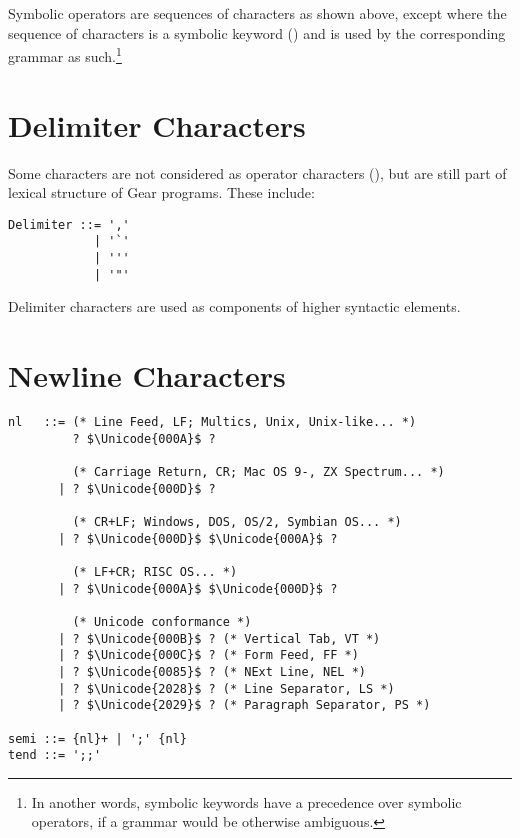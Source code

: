 Symbolic operators are sequences of characters as shown above, except where the sequence of characters is a symbolic keyword () and is used by the corresponding grammar as such.\footnote{In another words, symbolic keywords have a precedence over symbolic operators, if a grammar would be otherwise ambiguous.}





\section{Delimiter Characters}
\label{sec:delimiter-characters}

Some characters are not considered as operator characters (), but are still part of lexical structure of Gear programs. These include:

\syntax\begin{lstlisting}[deletekeywords={of}]
Delimiter ::= ','
            | '`'  
            | ''' 
            | '"'
\end{lstlisting}

Delimiter characters are used as components of higher syntactic elements. 





\section{Newline Characters}
\label{sec:newlinecharacters}

\syntax\begin{lstlisting}
nl   ::= (* Line Feed, LF; Multics, Unix, Unix-like... *)
         ? $\Unicode{000A}$ ? 
         
         (* Carriage Return, CR; Mac OS 9-, ZX Spectrum... *)
       | ? $\Unicode{000D}$ ? 
       
         (* CR+LF; Windows, DOS, OS/2, Symbian OS... *)
       | ? $\Unicode{000D}$ $\Unicode{000A}$ ?
       
         (* LF+CR; RISC OS... *)
       | ? $\Unicode{000A}$ $\Unicode{000D}$ ?
       
         (* Unicode conformance *)
       | ? $\Unicode{000B}$ ? (* Vertical Tab, VT *)
       | ? $\Unicode{000C}$ ? (* Form Feed, FF *)
       | ? $\Unicode{0085}$ ? (* NExt Line, NEL *)
       | ? $\Unicode{2028}$ ? (* Line Separator, LS *)
       | ? $\Unicode{2029}$ ? (* Paragraph Separator, PS *)
       
semi ::= {nl}+ | ';' {nl}
tend ::= ';;'
\end{lstlisting}

